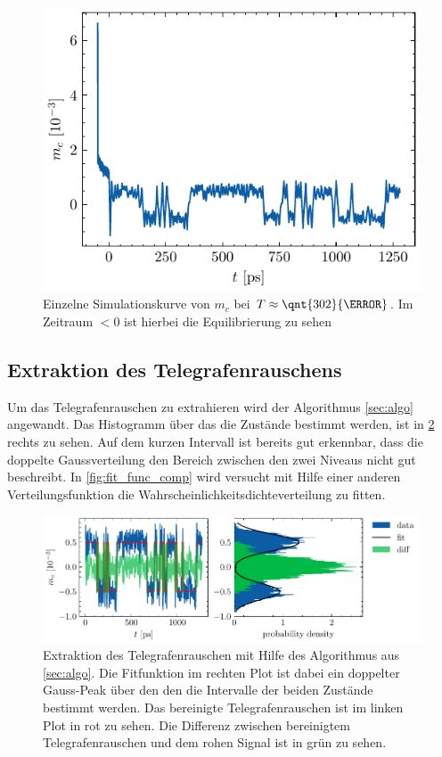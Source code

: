 \documentclass[main.tex]{subfiles}
\begin{document}
\begin{figure}[h]
    \centering
    \includegraphics{bilder/plots/theo-vis/example-telegraph-sim.pdf}
    \caption{Einzelne Simulationskurve von \(m_c\) bei \(T \approx \qnt{302}{\kelvin}\). Im Zeitraum \(<0\) ist hierbei die Equilibrierung zu sehen
    }\label{fig:bsp-run}
\end{figure}

\subsection{Extraktion des Telegrafenrauschens}

Um das Telegrafenrauschen zu extrahieren wird der Algorithmus \cref{sec:algo} angewandt.
Das Histogramm über das die Zustände bestimmt werden, ist in \cref{fig:extraktion-tgr} rechts zu sehen. Auf dem kurzen Intervall ist bereits gut erkennbar, dass die doppelte Gaussverteilung den Bereich zwischen den zwei Niveaus nicht gut beschreibt. In \cref{fig:fit_func_comp} wird versucht mit Hilfe einer anderen Verteilungsfunktion die Wahrscheinlichkeitsdichteverteilung zu fitten.

\begin{figure}[H]
    \centering
    \includegraphics{bilder/plots/Bz_0mT/mc_fit_hist_part2_26.03meV.pdf}
    \caption{Extraktion des Telegrafenrauschen mit Hilfe des Algorithmus aus \cref{sec:algo}. Die Fitfunktion im rechten Plot ist dabei ein doppelter Gauss-Peak über den den die Intervalle der beiden Zustände bestimmt werden. Das bereinigte Telegrafenrauschen ist im linken Plot in rot zu sehen. Die Differenz zwischen bereinigtem Telegrafenrauschen und dem rohen Signal ist in grün zu sehen.}\label{fig:extraktion-tgr}
\end{figure}
\end{document}
